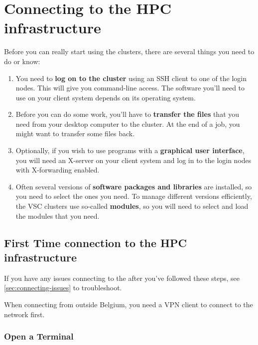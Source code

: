 \chapter{Connecting to the HPC infrastructure}
\label{ch:connecting}

Before you can really start using the \hpc clusters, there are several things you need to do or know:

\begin{enumerate}
\item  You need to \textbf{log on to the cluster} using an SSH client to one of the login nodes. This will give you command-line access. The software you'll need to use on your client system depends on its operating system.
\item  Before you can do some work, you'll have to \textbf{transfer the files} that you need from your desktop computer to the cluster. At the end of a job, you might want to transfer some files back.
\item  Optionally, if you wish to use programs with a \textbf{graphical user interface}, you will need an X-server on your client system and log in to the login nodes with X-forwarding enabled.
\item  Often several versions of \textbf{software packages and libraries} are installed, so you need to select the ones you need. To manage different versions efficiently, the VSC clusters use so-called \textbf{modules}, so you will need to select and load the modules that you need.
\end{enumerate}

\section{First Time connection to the HPC infrastructure}
\label{sec:first-time-connection-to-the-hpc}

If you have any issues connecting to the \hpc after you've followed these steps,
see \autoref{sec:connecting-issues} to troubleshoot.

\ifantwerpen
 When connecting from outside Belgium, you need a VPN client to connect to the \university network first.
\fi

\ifwindows

  \subsection{Open a Terminal}
  \label{sec:windows-open-a-terminal}

